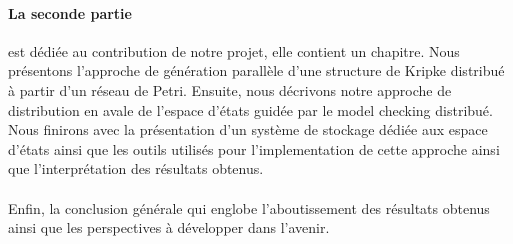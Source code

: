 \paragraph{La seconde partie} est dédiée au contribution de notre projet, elle contient un chapitre.
 Nous présentons l'approche de génération parallèle d'une structure de Kripke distribué à partir d'un réseau de Petri. Ensuite, nous décrivons notre approche de distribution en avale de l'espace d'états guidée par le model checking distribué. Nous finirons avec la présentation d'un système de stockage dédiée aux espace d'états ainsi que les outils utilisés pour l'implementation de cette approche ainsi que l’interprétation des résultats obtenus.
 \\\\
 
 
Enfin, la conclusion générale qui englobe l’aboutissement des résultats obtenus  ainsi que les perspectives à développer dans l’avenir.  

